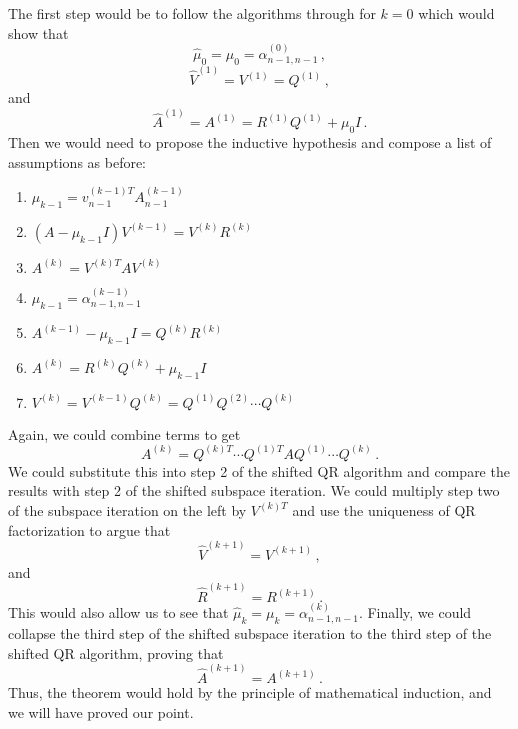 \documentclass[letterpaper,10pt]{article}
\begin{document}
The first step would be to follow the algorithms through for $k=0$ which would
show that
\[
\hat\mu_0=\mu_0=\alpha_{n-1,n-1}^{(0)}\,,
\]
\[
\hat V^{(1)}=V^{(1)}=Q^{(1)}\,,
\]
and
\[
\hat A^{(1)}=A^{(1)}=R^{(1)}Q^{(1)}+\mu_0I\,.
\]
Then we would need to propose the inductive hypothesis and compose a list of
assumptions as before:
\begin{enumerate}
\item $\mu_{k-1}=v_{n-1}^{(k-1)T}A_{n-1}^{(k-1)}$
\item $(A-\mu_{k-1}I)V^{(k-1)}=V^{(k)}R^{(k)}$
\item $A^{(k)}=V^{(k)T}AV^{(k)}$
\item $\mu_{k-1}=\alpha_{n-1,n-1}^{(k-1)}$
\item $A^{(k-1)}-\mu_{k-1}I=Q^{(k)}R^{(k)}$
\item $A^{(k)}=R^{(k)}Q^{(k)}+\mu_{k-1}I$
\item $V^{(k)}=V^{(k-1)}Q^{(k)}=Q^{(1)}Q^{(2)}\cdots Q^{(k)}$
\end{enumerate}

Again, we could combine terms to get
\begin{equation}
A^{(k)}=Q^{(k)T}\cdots Q^{(1)T}AQ^{(1)}\cdots Q^{(k)}\,.
\end{equation}
We could substitute this into step 2 of the shifted QR algorithm and compare the
results with step 2 of the shifted subspace iteration. We could multiply step
two of the subspace iteration on the left by $V^{(k)T}$ and use the uniqueness
of QR factorization to argue that
\[
\hat V^{(k+1)}=V^{(k+1)}\,,
\]
and
\[
\hat R^{(k+1)}=R^{(k+1)}\,.
\]
This would also allow us to see that $\hat \mu_k=\mu_k=\alpha_{n-1,n-1}^{(k)}$.
Finally, we could collapse the third step of the shifted subspace iteration to
the third step of the shifted QR algorithm, proving that
\[
\hat A^{(k+1)}=A^{(k+1)}\,.
\]
Thus, the theorem would hold by the principle of mathematical
induction, and we will have proved our point.
\end{document}
